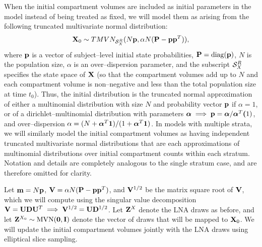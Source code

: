 When the initial compartment volumes are included as initial parameters in the model instead of being treated as fixed, we will model them as arising from the following truncated multivariate normal distribution: \begin{equation}
\label{eqn:lna_initdist_prior}
\mathbf{X}_0 \sim TMVN_{\mathcal{S}_X^R}(N\mathbf{p},\alpha N(\mathbf{P} - \mathbf{p}\mathbf{p}^T)),
\end{equation} 
where $ \mathbf{p} $ is a vector of subject--level initial state probabilities, $ \mathbf{P} = \mathrm{diag}(\mathbf{p}) $, $ N $ is the population size, $ \alpha $ is an over--dispersion parameter, and the subscript $ \mathcal{S}_X^R $ specifies the state space of $ \mathbf{X} $ (so that the compartment volumes add up to $ N $ and each compartment volume is non--negative and less than the total population size at time $ t_0 $). Thus, the initial distribution is the truncated normal approximation of either a multinomial distribution with size $ N $ and probability vector $ \mathbf{p} $ if $ \alpha = 1 $, or of a dirichlet--multinomial distribution with parameters $ \boldsymbol{\alpha} \implies \mathbf{p} = \boldsymbol{\alpha} / \boldsymbol{\alpha}^T\boldsymbol(1)$, and over--dispersion $ \alpha = (N + \boldsymbol{\alpha}^T\boldsymbol{1}) / (1 + \boldsymbol{\alpha}^T\boldsymbol{1})$. In models with multiple strata, we will similarly model the initial compartment volumes as having independent truncated multivariate normal distributions that are each approximations of multinomial distributions over initial compartment counts within each stratum. Notation and details are completely analogous to the single stratum case, and are therefore omitted for clarity.

Let $ \mathbf{m} = N\mathbf{p}$, $ \mathbf{V} = \alpha N(\mathbf{P} - \mathbf{p}\mathbf{p}^T) $, and $ \mathbf{V}^{1/2} $ be the matrix square root of $ \mathbf{V} $, which we will compute using the singular value decomposition $ \mathbf{V} = \mathbf{U}\mathbf{D}\mathbf{U}^T \implies \mathbf{V}^{1/2} = \mathbf{U}\mathbf{D}^{1/2}$. Let $ \mathbf{Z}^X $ denote the LNA draws as before, and let $ \mathbf{Z}^{X_0}\sim\mathrm{MVN}(\boldsymbol{0},\mathbf{I}) $ denote the vector of draws that will be mapped to $ \mathbf{X}_0 $. We will update the initial compartment volumes jointly with the LNA draws using elliptical slice sampling.

